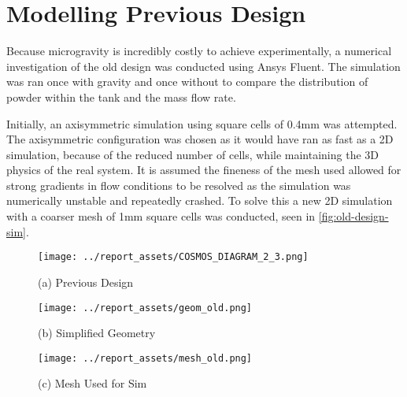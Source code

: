 \section{Modelling Previous Design}\label{sec:old-design-method}
Because microgravity is incredibly costly to achieve experimentally, a numerical investigation of the old design was conducted using Ansys Fluent. The simulation was ran once with gravity and once without to compare the distribution of powder within the tank and the mass flow rate. 

Initially, an axisymmetric simulation using square cells of 0.4mm was attempted. The axisymmetric configuration was chosen as it would have ran as fast as a 2D simulation, because of the reduced number of cells, while maintaining the 3D physics of the real system. It is assumed the fineness of the mesh used allowed for strong gradients in flow conditions to be resolved as the simulation was numerically unstable and repeatedly crashed. To solve this a new 2D simulation with a coarser mesh of 1mm square cells was conducted, seen in \autoref{fig:old-design-sim}.
\begin{figure}[htbp]
    \centering

    \begin{minipage}{0.3\textwidth}
        \centering
        \texttt{[image: ../report\_assets/COSMOS\_DIAGRAM\_2\_3.png]}
        \caption*{(a) Previous Design}
    \end{minipage}
    \hfill
    \begin{minipage}{0.3\textwidth}
        \centering
        \texttt{[image: ../report\_assets/geom\_old.png]}
        \caption*{(b) Simplified Geometry}\label{fig:idkyet9}
    \end{minipage}
    \hfill
    \begin{minipage}{0.3\textwidth}
        \centering
        \texttt{[image: ../report\_assets/mesh\_old.png]}
        \caption*{(c) Mesh Used for Sim}\label{fig:idkyet10}
    \end{minipage}
    
\end{figure}\label{fig:old-design-sim}
